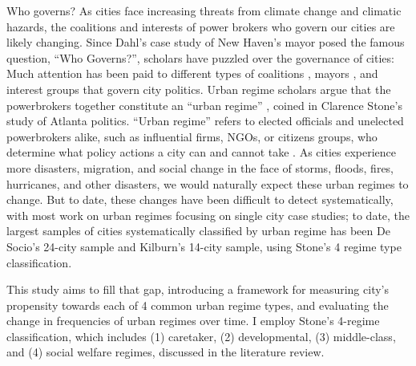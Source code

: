 \documentclass[preprint, 3p,
authoryear]{elsarticle} %
\begin{document}
Who governs? As cities face increasing threats from climate change and
climatic hazards, the coalitions and interests of power brokers who
govern our cities are likely changing. Since Dahl's
\citeyearpar{dahl_1961} case study of New Haven's mayor posed the famous
question, ``Who Governs?'', scholars have puzzled over the governance of
cities: Much attention has been paid to different types of coalitions
\citep{munoz_and_henry_1986, stone_1989, stoker_and_mossberger_1994, gilliam_1996, davies_2017, russo_and_scarnato_2018},
mayors
\citep{ramirez_perez_et_al_2008, debenedictis_kessner_and_warshaw_2016, freier_and_thomasius_2016, einstein_and_glick_2018},
and interest groups
\citep{logan_and_rabrenovic_1990, mossberger_and_stoker_2001, cooper_et_al_2005, portney_and_berry_2016, anzia_2019}
that govern city politics. Urban regime scholars argue that the
powerbrokers together constitute an ``urban regime'' \citep{stone_1993},
coined in Clarence Stone's \citeyearpar{stone_1989} study of Atlanta
politics. ``Urban regime'' refers to elected officials and unelected
powerbrokers alike, such as influential firms, NGOs, or citizens groups,
who determine what policy actions a city can and cannot take
\citep{mossberger_and_stoker_2001}. As cities experience more disasters,
migration, and social change in the face of storms, floods, fires,
hurricanes, and other disasters, we would naturally expect these urban
regimes to change. But to date, these changes have been difficult to
detect systematically, with most work on urban regimes focusing on
single city case studies; to date, the largest samples of cities
systematically classified by urban regime has been De Socio's
\citeyearpar{de_socio_2007} 24-city sample and Kilburn's
\citeyearpar{kilburn_2004} 14-city sample, using Stone's
\citeyearpar{stone_1993} 4 regime type classification.

This study aims to fill that gap, introducing a framework for measuring
city's propensity towards each of 4 common urban regime types, and
evaluating the change in frequencies of urban regimes over time. I
employ Stone's \citeyearpar{stone_1993} 4-regime classification, which
includes (1) caretaker, (2) developmental, (3) middle-class, and (4)
social welfare regimes, discussed in the literature review.
\end{document}
